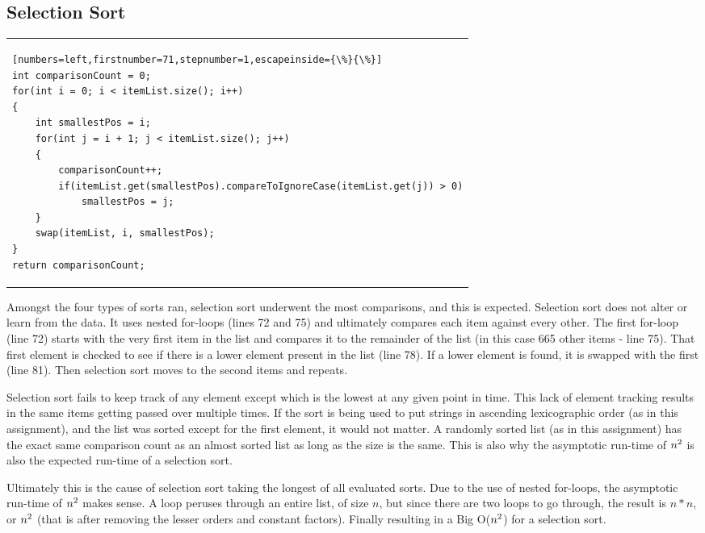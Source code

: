 \documentclass[letterpaper, 10pt,DIV=13]{scrartcl}
\numberwithin{equation}{section} %
\numberwithin{figure}{section} %
\numberwithin{table}{section} %
\begin{document}
\subsection{Selection Sort}

\begin{center}
\begin{tabular}{l}
\begin{lstlisting}[numbers=left,firstnumber=71,stepnumber=1,escapeinside={\%}{\%}]
int comparisonCount = 0;
for(int i = 0; i < itemList.size(); i++)
{
    int smallestPos = i;
    for(int j = i + 1; j < itemList.size(); j++)
    {
        comparisonCount++;
        if(itemList.get(smallestPos).compareToIgnoreCase(itemList.get(j)) > 0)
            smallestPos = j;
    }
    swap(itemList, i, smallestPos);
}
return comparisonCount;
\end{lstlisting}
\end{tabular}
\end{center}\textbf{}

Amongst the four types of sorts ran, selection sort underwent the most comparisons, and this is expected.  Selection sort does not alter or learn from the data.  It uses nested for-loops (lines 72 and 75) and ultimately compares each item against every other.  The first for-loop (line 72) starts with the very first item in the list and compares it to the remainder of the list (in this case 665 other items - line 75).  That first element is checked to see if there is a lower element present in the list (line 78).  If a lower element is found, it is swapped with the first (line 81).  Then selection sort moves to the second items and repeats.  

Selection sort fails to keep track of any element except which is the lowest at any given point in time.  This lack of element tracking results in the same items getting passed over multiple times.  If the sort is being used to put strings in ascending lexicographic order (as in this assignment), and the list was sorted except for the first element, it would not matter.  A randomly sorted list (as in this assignment) has the exact same comparison count as an almost sorted list as long as the size is the same.  This is also why the asymptotic run-time of $n\textsuperscript{2}$ is also the expected run-time of a selection sort.  

Ultimately this is the cause of selection sort taking the longest of all evaluated sorts.  Due to the use of nested for-loops, the asymptotic run-time of $n\textsuperscript{2}$ makes sense.  A loop peruses through an entire list, of size $n$, but since there are two loops to go through, the result is $n * n$, or $n\textsuperscript{2}$ (that is after removing the lesser orders and constant factors).  Finally resulting in a Big O($n\textsuperscript{2}$) for a selection sort.
\end{document}

